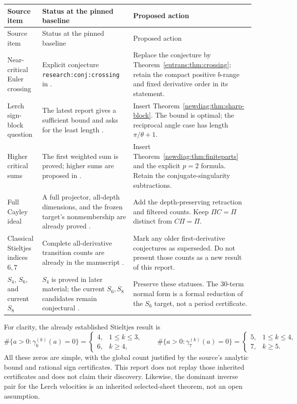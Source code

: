 \documentclass[11pt,a4paper]{article}
\numberwithin{equation}{section}
\theoremstyle{definition}
\theoremstyle{remark}
\begin{document}
\begin{longtable}{@{}>{\raggedright\arraybackslash}p{}>{\raggedright\arraybackslash}p{}>{\raggedright\arraybackslash}p{}@{}}
\toprule
Source item & Status at the pinned baseline & Proposed action\\
\midrule
\endfirsthead
\toprule
Source item & Status at the pinned baseline & Proposed action\\
\midrule
\endhead
Near-critical Euler crossing & Explicit conjecture
\texttt{research:conj:crossing} in \cite{RepoEuler}. & Replace the conjecture
by Theorem~\ref{eutrans:thm:crossing}; retain the compact positive
$b$-range and fixed derivative order in its statement.\\[5pt]
Lerch sign-block question & The latest report gives a sufficient bound
and asks for the least length \cite{RepoLerch}. & Insert
Theorem~\ref{newdiag:thm:sharp-block}. The bound is optimal; the reciprocal
angle case has length $\pi/\theta+1$.\\[5pt]
Higher critical sums & The first weighted sum is proved; higher sums
are proposed in \cite{RepoLerch}. & Insert
Theorem~\ref{newdiag:thm:finiteparts} and the explicit $p=2$ formula.
Retain the conjugate-singularity subtractions.\\[5pt]
Full Cayley ideal & A full projector, all-depth dimensions, and the
frozen target's nonmembership are already proved
\cite{depth:PriorProjection}. & Add the depth-preserving retraction
and filtered counts. Keep $\Pi C=\Pi$ distinct from $C\Pi=\Pi$.\\[5pt]
Classical Stieltjes indices $6,7$ & Complete all-derivative transition
counts are already in the manuscript \cite{RepoZeros}. & Mark any
older first-derivative conjectures as superseded. Do not present those
counts as a new result of this report.\\[5pt]
$S_4$, $S_6$, and current $S_8$ & $S_4$ is proved in later material;
the current $S_6,S_8$ candidates remain conjectural
\cite{RepoManuscript}. & Preserve these statuses. The 30-term normal form
is a formal reduction of the $S_6$ target, not a period certificate.\\
\bottomrule
\end{longtable}

For clarity, the already established Stieltjes result is
\[
 \#\{a>0:\gamma_6^{(k)}(a)=0\}=
 \begin{cases}4,&1\leq k\leq3,\\6,&k\geq4,\end{cases}
 \qquad
 \#\{a>0:\gamma_7^{(k)}(a)=0\}=
 \begin{cases}5,&1\leq k\leq4,\\7,&k\geq5.
 \end{cases}
\]
All these zeros are simple, with the global count justified by the
source's analytic bound and rational sign certificates. This report does
not replay those inherited certificates and does not claim their
discovery. Likewise, the dominant inverse pair for the Lerch velocities
is an inherited selected-sheet theorem, not an open assumption.
\end{document}
